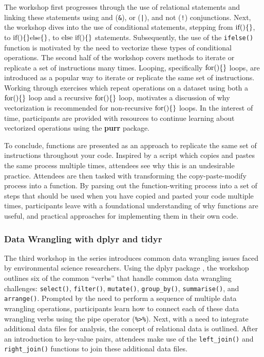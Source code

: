 \documentclass[12pt]{article}
\begin{document}
\quad The workshop first progresses through the use of relational
statements and linking these statements using and (\texttt{\&}), or
(\texttt{|}), and not (\texttt{!}) conjunctions. Next, the workshop dives into
the use of conditional statements, stepping from 
\texttt{$\text{if}\mathbf{\small(} \small) \small\{ \small\}$}, to 
\texttt{$\text{if}\small( \small) \small\{ \small\}\text{else}\small\{\small\}$},
to \texttt{$\text{else if}\small( \small) \small\{ \small\}$} statements.
Subsequently, the use of the \texttt{ifelse()} function is motivated by the need
to vectorize these types of conditional operations. The second half of the
workshop covers methods to iterate or replicate a set of instructions many
times. Looping, specifically
\texttt{$\text{for}\small(\small) \small\{ \small\}$} loops, are introduced as a
popular way to iterate or replicate the same set of instructions. Working
through exercises which repeat operations on a dataset using both a 
\texttt{$\text{for}\small(\small) \small\{ \small\}$} loop and a recursive
\texttt{$\text{for}\small(\small) \small\{ \small\}$} loop, motivates a
discussion of why vectorization is recommended for non-recursive
\texttt{$\text{for}\small(\small) \small\{ \small\}$} loops. In
the interest of time, participants are provided with resources to continue
learning about vectorized operations using the \textbf{purr} package. 

\quad To conclude, functions are presented as an approach to replicate the same
set of instructions throughout your code. Inspired by a script
which copies and pastes the same process multiple times, attendees see
why this is an undesirable practice. Attendees are then tasked with transforming
the copy-paste-modify process into a function. By parsing out the function-writing
process into a set of steps that should be used when you have copied and
pasted your code multiple times, participants leave with a foundational
understanding of why functions are useful, and practical approaches for
implementing them in their own code.

\subsubsection{Data Wrangling with dplyr and tidyr}
\label{sec:wrangle}

\noindent The third workshop in the series introduces common data wrangling
issues faced by environmental science researchers. Using the dplyr package
\citep{dplyr}, the workshop outlines six of the common ``verbs'' that
handle common data wrangling challenges: \texttt{select()}, \texttt{filter()},
\texttt{mutate()}, \texttt{group\_by()}, \texttt{summarise()}, and
\texttt{arrange()}. Prompted by the need to perform a sequence of multiple data
wrangling operations, participants learn how to connect each of these
data wrangling verbs using the pipe operator (\texttt{\%>\%}). Next, with a 
need to integrate additional data files for analysis, the concept of relational
data is outlined. After an introduction to key-value pairs, attendees
make use of the \texttt{left\_join()} and \texttt{right\_join()} functions to
join these additional data files. 
\end{document}
